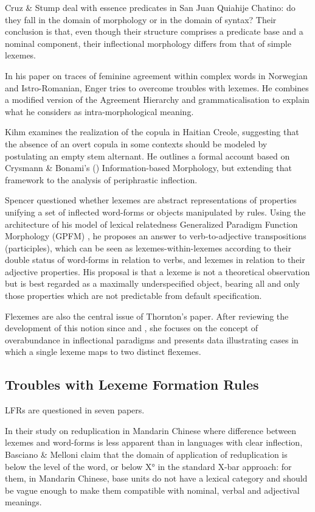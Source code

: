 \documentclass[output=paper]{langsci/langscibook}
\begin{document}
Cruz \& Stump deal with essence predicates in San Juan Quiahije
Chatino: do they fall in the domain of morphology or in the domain of
syntax? Their conclusion is that, even though their structure comprises
a predicate base and a nominal component, their inflectional morphology
differs from that of simple lexemes.

In his paper on traces of feminine agreement within complex words in
Norwegian and Istro-Romanian, Enger tries to overcome troubles with
lexemes. He combines a modified version of the Agreement Hierarchy
\citep{Corbett79} and grammaticalisation to explain what he considers as
intra-morphological meaning.

Kihm examines the realization of the copula in Haitian Creole,
suggesting that the absence of an overt copula in some contexts should
be modeled by postulating an empty stem alternant. He outlines a formal
account based on Crysmann \& Bonami's (\citeyear{Crysmann14}) Information-based Morphology,
but extending that framework to the analysis of periphrastic inflection.

Spencer questioned whether lexemes are abstract representations of
properties unifying a set of inflected word-forms or objects manipulated
by rules. Using the architecture of his model of lexical relatedness
Generalized Paradigm Function Morphology (GPFM) \citep{Spencer13}, he
proposes an answer to verb-to-adjective transpositions (participles),
which can be seen as lexemes-within-lexemes according to their double
status of word-forms in relation to verbs, and lexemes in relation to
their adjective properties. His proposal is that a lexeme is not a
theoretical observation but is best regarded as a maximally
underspecified object, bearing all and only those properties which are
not predictable from default specification.

Flexemes are also the central issue of Thornton's paper. After reviewing
the development of this notion since \citet{Fradin03} and \citet{Fradin03b}, she focuses on the concept of overabundance in
inflectional paradigms and presents data illustrating cases in which a
single lexeme maps to two distinct flexemes.

\subsection{Troubles with Lexeme Formation Rules}
\largerpage

LFRs are questioned in seven papers.

In their study on reduplication in Mandarin Chinese where difference
between lexemes and word-forms is less apparent than in languages with
clear inflection, Basciano \& Melloni claim that the domain of
application of reduplication is below the level of the word, or below X°
in the standard X-bar approach: for them, in Mandarin Chinese, base
units do not have a lexical category and should be vague enough to make them
compatible with nominal, verbal and adjectival meanings.
\end{document}
